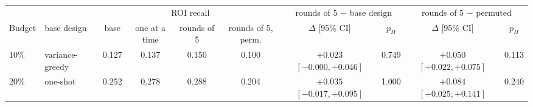 \begin{tabular}{llcccccccc}
\toprule
 & & \multicolumn{4}{c}{ROI recall} & \multicolumn{2}{c}{rounds of 5 $-$ base design} & \multicolumn{2}{c}{rounds of 5 $-$ permuted} \\
\cmidrule(lr){3-6}\cmidrule(lr){7-8}\cmidrule(lr){9-10}
Budget & base design & base & one at a time & rounds of 5 & rounds of 5, perm. & $\Delta$ [95\% CI] & $p_H$ & $\Delta$ [95\% CI] & $p_H$ \\
\midrule
10\% & variance-greedy & 0.127 & 0.137 & 0.150 & 0.100 & ${+}0.023$ $[-0.000, {+}0.046]$ & 0.749 & ${+}0.050$ $[{+}0.022, {+}0.075]$ & 0.113 \\
20\% & one-shot & 0.252 & 0.278 & 0.288 & 0.204 & ${+}0.035$ $[-0.017, {+}0.095]$ & 1.000 & ${+}0.084$ $[{+}0.025, {+}0.141]$ & 0.240 \\
\bottomrule
\end{tabular}